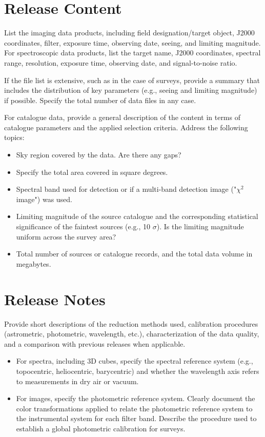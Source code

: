 \documentclass[a4paper,10pt]{book}
\begin{document}
\section{Release Content}

List the imaging data products, including field designation/target object, J2000 coordinates, filter, exposure time, observing date, seeing, and limiting magnitude. For spectroscopic data products, list the target name, J2000 coordinates, spectral range, resolution, exposure time, observing date, and signal-to-noise ratio.

If the file list is extensive, such as in the case of surveys, provide a summary that includes the distribution of key parameters (e.g., seeing and limiting magnitude) if possible. Specify the total number of data files in any case.

For catalogue data, provide a general description of the content in terms of catalogue parameters and the applied selection criteria. Address the following topics:

\begin{itemize}
\item Sky region covered by the data. Are there any gaps?
\item Specify the total area covered in square degrees.
\item Spectral band used for detection or if a multi-band detection image ("$\chi^2$ image") was used.
\item Limiting magnitude of the source catalogue and the corresponding statistical significance of the faintest sources (e.g., 10 $\sigma$). Is the limiting magnitude uniform across the survey area?
\item Total number of sources or catalogue records, and the total data volume in megabytes.
\end{itemize}

\section{Release Notes}

Provide short descriptions of the reduction methods used, calibration procedures (astrometric, photometric, wavelength, etc.), characterization of the data quality, and a comparison with previous releases when applicable.

\begin{itemize}
\item For spectra, including 3D cubes, specify the spectral reference system (e.g., topocentric, heliocentric, barycentric) and whether the wavelength axis refers to measurements in dry air or vacuum.
\item For images, specify the photometric reference system. Clearly document the color transformations applied to relate the photometric reference system to the instrumental system for each filter band. Describe the procedure used to establish a global photometric calibration for surveys.
\end{itemize}
\end{document}

